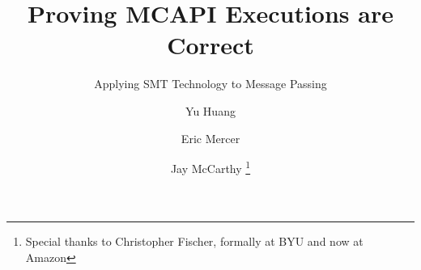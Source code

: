 \documentclass{llncs}
\begin{document}
%
\pagestyle{headings}  %
%
\title{Proving MCAPI Executions are Correct}
\subtitle{Applying SMT Technology to Message Passing}

\author{Yu Huang \and Eric Mercer \and Jay McCarthy \thanks{Special thanks to Christopher Fischer, formally at BYU and now at Amazon}}

\maketitle



%
%
\begin{abstract}


\end{abstract}
%





%





\end{document}
